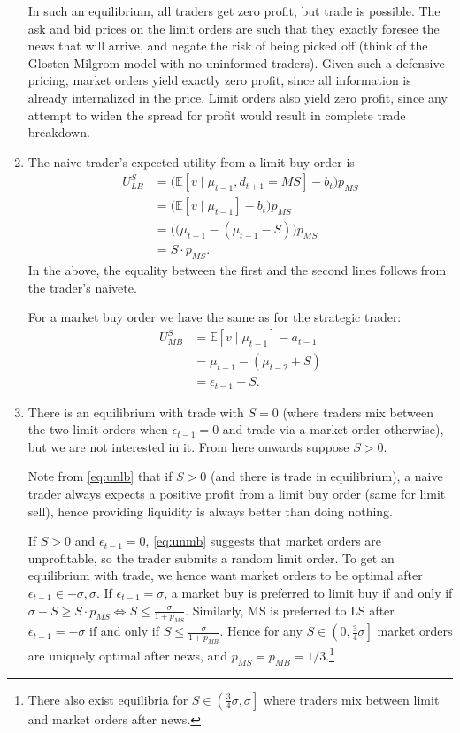 \documentclass[a4paper]{article}
\begin{document}
\begin{enumerate}
	In such an equilibrium, all traders get zero profit, but trade is possible. The ask and bid prices on the limit orders are such that they exactly foresee the news that will arrive, and negate the risk of being picked off (think of the Glosten-Milgrom model with no uninformed traders). Given such a defensive pricing, market orders yield exactly zero profit, since all information is already internalized in the price. Limit orders also yield zero profit, since any attempt to widen the spread for profit would result in complete trade breakdown.
	
	\item The naive trader's expected utility from a limit buy order is
	\begin{align}
		U^S_{LB}
		&= \Big( \mathbb{E}[v \mid \mu_{t-1}, d_{t+1}=MS] - b_t \Big) p_{MS} 
		\nonumber
		\\
		&= \Big( \mathbb{E}[v \mid \mu_{t-1}] - b_t \Big) p_{MS} 
		\nonumber
		\\
		&= \Big( (\mu_{t-1} - (\mu_{t-1} - S) \Big) p_{MS}
		\nonumber
		\\
		&= S \cdot p_{MS}.
		\label{eq:unlb}
	\end{align}
	In the above, the equality between the first and the second lines follows from the trader's naivete.
	
	For a market buy order we have the same as for the strategic trader:
	\begin{align}
		U^S_{MB}
		&= \mathbb{E}[v \mid \mu_{t-1}] - a_{t-1} 
		\nonumber
		\\
		&= \mu_{t-1} - (\mu_{t-2} + S)
		\nonumber
		\\
		&= \epsilon_{t-1} - S.
		\label{eq:unmb}
	\end{align}
	
	\item There is an equilibrium with trade with $S=0$ (where traders mix between the two limit orders when $\epsilon_{t-1}=0$ and trade via a market order otherwise), but we are not interested in it. From here onwards suppose $S>0$.
	
	Note from \eqref{eq:unlb} that if $S>0$ (and there is trade in equilibrium), a naive trader always expects a positive profit from a limit buy order (same for limit sell), hence providing liquidity is always better than doing nothing. 
	
	If $S>0$ and $\epsilon_{t-1} = 0$, \eqref{eq:unmb} suggests that market orders are unprofitable, so the trader submits a random limit order. To get an equilibrium with trade, we hence want market orders to be optimal after $\epsilon_{t-1} \in {-\sigma,\sigma}$. If $\epsilon_{t-1}=\sigma$, a market buy is preferred to limit buy if and only if $\sigma - S \geq S \cdot p_{MS} \iff S \leq \frac{\sigma}{1+p_{MS}}$. Similarly, MS is preferred to LS after $\epsilon_{t-1}=-\sigma$ if and only if $S \leq \frac{\sigma}{1+p_{MB}}$.
	Hence for any $S \in \left( 0, \frac{3}{4}\sigma \right]$ market orders are uniquely optimal after news, and $p_{MS}=p_{MB}=1/3$.\footnote{There also exist equilibria for $S \in \left( \frac{3}{4}\sigma, \sigma \right]$ where traders mix between limit and market orders after news.}
	

\end{enumerate}
\end{document}
